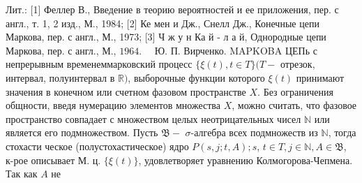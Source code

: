 \documentclass[10pt]{article}
\begin{document}
Лит.: [1] Феллер В., Введение в теорию вероятностей и ее приложения, пер. с англ., т. 1, 2 изд., М., 1984; [2] Ке мен и Дж., Снелл Дж., Конечные цепи Маркова, пер. с англ., М., 1973; [3] Ч ж у н Ка й - л а й, Однородные цепи Маркова, пер. с англ., М., $1964 . \quad$ Ю. П. Вирченко. MAPKOBA ЦЕПь с непрерывным временеммарковский процесс $\{\xi(t), t \in T\}(T-$ отрезок, интервал, полуинтервал в $\mathbb{R})$, выборочные функции которого $\xi(t)$ принимают значения в конечном или счетном фазовом пространстве $X$. Без ограничения общности, введя нумерацию элементов множества $X$, можно считать, что фазовое пространство совпадает с множеством целых неотрицательных чисел $\mathbb{N}$ или является его подмножеством. Пусть $\mathfrak{B}-$ $\sigma$-алгебра всех подмножеств из $\mathbb{N}$, тогда стохасти ческое (полустохастическое) ядро $P(s, j ; t, A) ; s$, $t \in T, j \in \mathbb{N}, A \in \mathfrak{B}$, к-рое описывает М. ц. $\{\xi(t)\}$, удовлетворяет уравнению Колмогорова-Чепмена. Так как $A$ не
\end{document}
